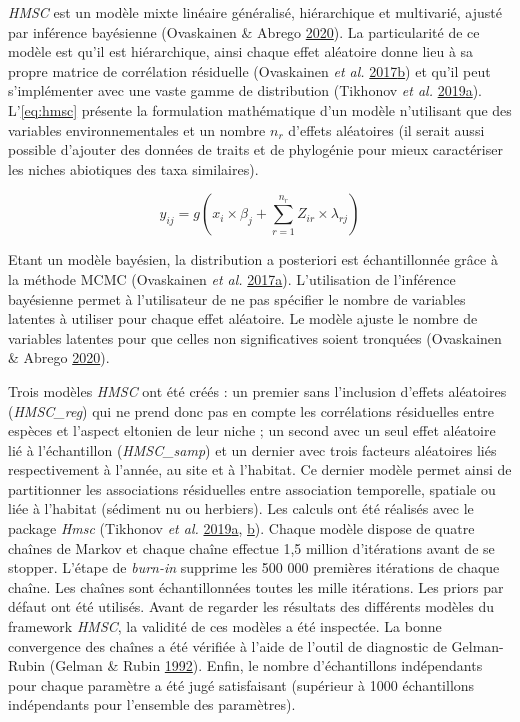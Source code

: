 \documentclass[12pt,]{article}
\begin{document}
\emph{HMSC} est un modèle mixte linéaire généralisé, hiérarchique et
multivarié, ajusté par inférence bayésienne (Ovaskainen \& Abrego
\protect\hyperlink{ref-Ovaskainen_2020}{2020}). La particularité de ce
modèle est qu'il est hiérarchique, ainsi chaque effet aléatoire donne
lieu à sa propre matrice de corrélation résiduelle (Ovaskainen \emph{et
al.}
\protect\hyperlink{ref-Ovaskainen_2017a}{2017}\protect\hyperlink{ref-Ovaskainen_2017a}{b})
et qu'il peut s'implémenter avec une vaste gamme de distribution
(Tikhonov \emph{et al.}
\protect\hyperlink{ref-Tikhonov_2019b}{2019}\protect\hyperlink{ref-Tikhonov_2019b}{a}).
L'\cref{eq:hmsc} présente la formulation mathématique d'un modèle
n'utilisant que des variables environnementales et un nombre \(n_r\)
d'effets aléatoires (il serait aussi possible d'ajouter des données de
traits et de phylogénie pour mieux caractériser les niches abiotiques
des taxa similaires).

\begin{equation} y_{ij} = g\left(x_i \times \beta_j + \sum_{r = 1}^{n_r} Z_{ir} \times \lambda_{rj}\right) \label{eq:hmsc}\end{equation}

Etant un modèle bayésien, la distribution a posteriori est
échantillonnée grâce à la méthode MCMC (Ovaskainen \emph{et al.}
\protect\hyperlink{ref-Ovaskainen_2017b}{2017}\protect\hyperlink{ref-Ovaskainen_2017b}{a}).
L'utilisation de l'inférence bayésienne permet à l'utilisateur de ne pas
spécifier le nombre de variables latentes à utiliser pour chaque effet
aléatoire. Le modèle ajuste le nombre de variables latentes pour que
celles non significatives soient tronquées (Ovaskainen \& Abrego
\protect\hyperlink{ref-Ovaskainen_2020}{2020}).

Trois modèles \emph{HMSC} ont été créés : un premier sans l'inclusion
d'effets aléatoires (\emph{HMSC\_reg}) qui ne prend donc pas en compte
les corrélations résiduelles entre espèces et l'aspect eltonien de leur
niche ; un second avec un seul effet aléatoire lié à l'échantillon
(\emph{HMSC\_samp}) et un dernier avec trois facteurs aléatoires liés
respectivement à l'année, au site et à l'habitat. Ce dernier modèle
permet ainsi de partitionner les associations résiduelles entre
association temporelle, spatiale ou liée à l'habitat (sédiment nu ou
herbiers). Les calculs ont été réalisés avec le package \emph{Hmsc}
(Tikhonov \emph{et al.}
\protect\hyperlink{ref-Tikhonov_2019b}{2019}\protect\hyperlink{ref-Tikhonov_2019b}{a},
\protect\hyperlink{ref-Hmsc_2019}{b}). Chaque modèle dispose de quatre
chaînes de Markov et chaque chaîne effectue 1,5 million d'itérations
avant de se stopper. L'étape de \emph{burn-in} supprime les 500 000
premières itérations de chaque chaîne. Les chaînes sont échantillonnées
toutes les mille itérations. Les priors par défaut ont été utilisés.
Avant de regarder les résultats des différents modèles du framework
\emph{HMSC}, la validité de ces modèles a été inspectée. La bonne
convergence des chaînes a été vérifiée à l'aide de l'outil de diagnostic
de Gelman-Rubin (Gelman \& Rubin
\protect\hyperlink{ref-Gelman_1992}{1992}). Enfin, le nombre
d'échantillons indépendants pour chaque paramètre a été jugé
satisfaisant (supérieur à 1000 échantillons indépendants pour l'ensemble
des paramètres).
\end{document}
